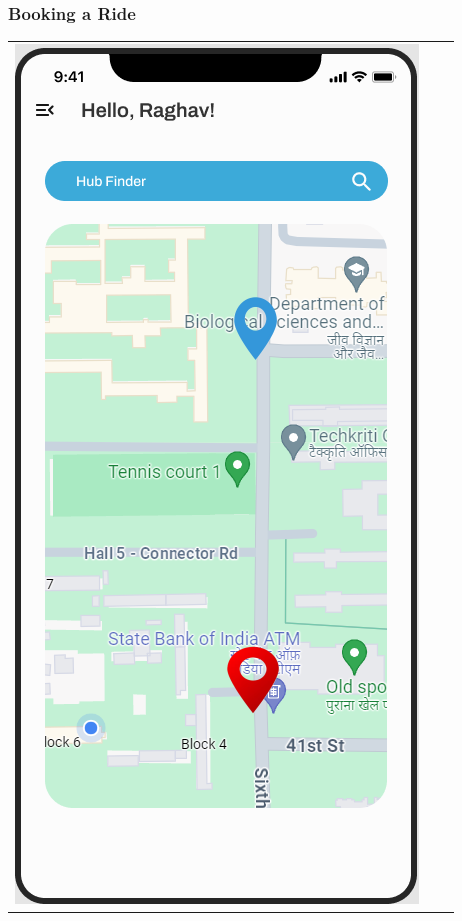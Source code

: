 \subsubsection{Booking a Ride}
\begin{center}
\begin{tabular}{ccc}
    \includegraphics[scale=0.35]{ui-images/Dashboard.png} &

\end{tabular}
\end{center}

